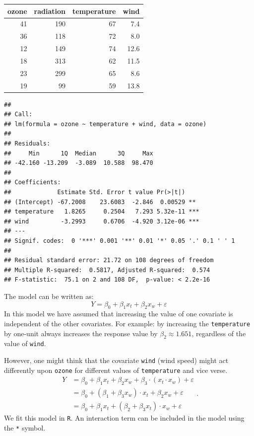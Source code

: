 \documentclass[
]{article}
\begin{document}
\begin{tabular}{r|r|r|r}
\hline
ozone & radiation & temperature & wind\\
\hline
41 & 190 & 67 & 7.4\\
\hline
36 & 118 & 72 & 8.0\\
\hline
12 & 149 & 74 & 12.6\\
\hline
18 & 313 & 62 & 11.5\\
\hline
23 & 299 & 65 & 8.6\\
\hline
19 & 99 & 59 & 13.8\\
\hline
\end{tabular}

\small

\begin{verbatim}
## 
## Call:
## lm(formula = ozone ~ temperature + wind, data = ozone)
## 
## Residuals:
##     Min      1Q  Median      3Q     Max 
## -42.160 -13.209  -3.089  10.588  98.470 
## 
## Coefficients:
##             Estimate Std. Error t value Pr(>|t|)    
## (Intercept) -67.2008    23.6083  -2.846  0.00529 ** 
## temperature   1.8265     0.2504   7.293 5.32e-11 ***
## wind         -3.2993     0.6706  -4.920 3.12e-06 ***
## ---
## Signif. codes:  0 '***' 0.001 '**' 0.01 '*' 0.05 '.' 0.1 ' ' 1
## 
## Residual standard error: 21.72 on 108 degrees of freedom
## Multiple R-squared:  0.5817, Adjusted R-squared:  0.574 
## F-statistic:  75.1 on 2 and 108 DF,  p-value: < 2.2e-16
\end{verbatim}

\normalsize

The model can be written as:
\[Y = \beta_0 + \beta_1 x_t + \beta_2 x_w + \varepsilon\] In this model
we have assumed that increasing the value of one covariate is
independent of the other covariates. For example: by increasing the
\texttt{temperature} by one-unit always increases the response value by
\(\beta_2 \approx 1.651\), regardless of the value of \texttt{wind}.

However, one might think that the covariate \texttt{wind} (wind speed)
might act differently upon \texttt{ozone} for different values of
\texttt{temperature} and vice verse.
\[\begin{aligned} Y &= \beta_0 +  \beta_1 x_t + \beta_2 x_w + \beta_3\cdot(x_t  \cdot x_w) +\varepsilon \\ &= \beta_0 +  (\beta_1 + \beta_3 x_w) \cdot x_t + \beta_2 x_w + \varepsilon \\ &= \beta_0 + \beta_1 x_t + (\beta_2 + \beta_3 x_t) \cdot x_w + \varepsilon \end{aligned}.\]
We fit this model in \texttt{R}. An interaction term can be included in
the model using the \texttt{*} symbol.
\end{document}
